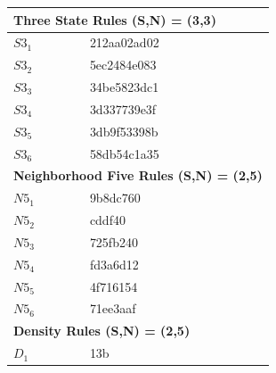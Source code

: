 \documentclass{elsarticle}
\begin{document}
\begin{multicols}{2}
\begin{table}[!htb] \centering
\small
\begin{tabular}{|p{2cm}|l|}
\hline
\multicolumn{2}{|l|}{\textbf{Three State Rules (S,N) = (3,3)}} \\ \hline
$S3_{1}$ &  212aa02ad02\\ \hline
$S3_{2}$ &  5ec2484e083\\ \hline
$S3_{3}$ &  34be5823dc1\\ \hline
$S3_{4}$ &   3d337739e3f\\ \hline
$S3_{5}$ &   3db9f53398b\\ \hline
$S3_{6}$ &   58db54c1a35\\ \hline
\multicolumn{2}{|l|}{\textbf{Neighborhood Five Rules (S,N) = (2,5)}} \\ \hline
$N5_{1}$ &   9b8dc760\\ \hline
$N5_{2}$ &    cddf40\\ \hline
$N5_{3}$ &   725fb240\\ \hline
$N5_{4}$ &   fd3a6d12\\ \hline
$N5_{5}$ &   4f716154\\ \hline
$N5_{6}$ &   71ee3aaf\\ \hline
\multicolumn{2}{|l|}{\textbf{Density Rules (S,N) = (2,5)}} \\ \hline
$D_{1}$ &   13b \\ \hline

\end{tabular}
\end{table}
\end{multicols}
\end{document}
